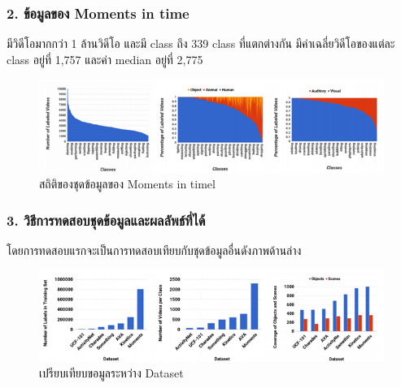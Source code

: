 \subsubsection*{2. ข้อมูลของ Moments in time}
มีวิดีโอมากกว่า 1 ล้านวิดีโอ และมี class ถึง 339 class ที่แตกต่างกัน มีค่าเฉลี่ยวิดีโอของแต่ละ class อยู่ที่ 1,757 และค่า median อยู่ที่ 2,775

\begin{figure}[!ht]
	\centering
	\includegraphics[width=1\textwidth]{chapter2/images/statistic_moment.png}
		\caption{สถิติของชุดข้อมูลของ Moments in timel}
    	\label{fig:statistic_moment}
\end{figure}
\clearpage
\subsubsection*{3. วิธีการทดสอบชุดข้อมูลและผลลัพธ์ที่ได้}
โดยการทดสอบแรกจะเป็นการทดสอบเทียบกับชุดข้อมูลอื่นดังภาพด้านล่าง

\begin{figure}[!ht]
	\centering
	\includegraphics[width=1\textwidth]{chapter2/images/compare_dataset.png}
		\caption{เปรียบเทียบขอมูลระหว่าง Dataset}
    	\label{fig:compare_dataset}
\end{figure}

